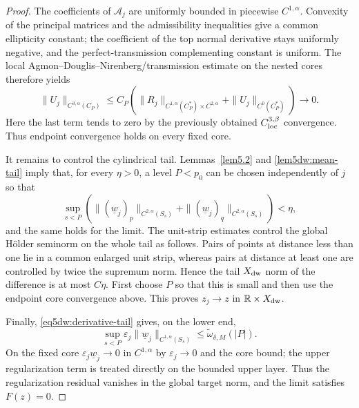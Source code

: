 \documentclass[11pt,reqno]{amsart}
\numberwithin{equation}{section}
\theoremstyle{definition}
\theoremstyle{remark}
\begin{document}
\begin{proof}
The coefficients of $\mathscr A_j$ are uniformly bounded in
piecewise $C^{1,\alpha}$.  Convexity of the principal matrices and
the admissibility inequalities give a common ellipticity constant;
the coefficient of the top normal derivative stays uniformly
negative, and the perfect-transmission complementing constant is
uniform.  The local Agmon--Douglis--Nirenberg/transmission estimate
on the nested cores therefore yields
\[
 \|U_j\|_{C^{3,\alpha}(C_P)}
 \le C_P\left(
  \|R_j\|_{C^{1,\alpha}(C_P^*)\times C^{2,\alpha}}
  +\|U_j\|_{C^0(C_P^*)}
 \right)\longrightarrow0.
\]
Here the last term tends to zero by the previously obtained
$C^{3,\beta}_{\rm loc}$ convergence.  Thus endpoint convergence holds
on every fixed core.

It remains to control the cylindrical tail.  Lemmas~\ref{lem5.2} and
\ref{lem5dw:mean-tail} imply that, for every $\eta>0$, a level
$P<p_0$ can be chosen independently of $j$ so that
\[
 \sup_{s<P}\left(
 \|(\underline w_j)_p\|_{C^{2,\alpha}(S_s)}
 +\|(\underline w_j)_q\|_{C^{2,\alpha}(S_s)}\right)<\eta,
\]
and the same holds for the limit.  The unit-strip estimates control
the global H\"older seminorm on the whole tail as follows.  Pairs of
points at distance less than one lie in a common enlarged unit strip,
whereas pairs at distance at least one are controlled by twice the
supremum norm.  Hence the tail $X_{\rm dw}$ norm of the difference is
at most $C\eta$.  First choose $P$ so that this is small and then use
the endpoint core convergence above.  This proves
$z_j\to z$ in $\mathbb R\times X_{\rm dw}$.

Finally, \eqref{eq5dw:derivative-tail} gives, on the lower end,
\[
 \sup_{s<P}\varepsilon_j
 \|\underline w_j\|_{C^{1,\alpha}(S_s)}
 \le\widetilde\omega_{\delta,M}(|P|).
\]
On the fixed core
$\varepsilon_j\underline w_j\to0$ in $C^{1,\alpha}$ by
$\varepsilon_j\to0$ and the core bound; the upper regularization term
is treated directly on the bounded upper layer.  Thus the
regularization residual vanishes in the global target norm, and the
limit satisfies $F(z)=0$.
\end{proof}
\end{document}
